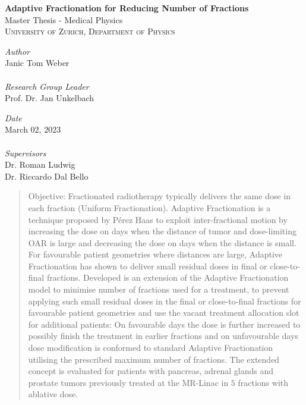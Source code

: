 \documentclass[\relativeRoot/ada.tex]{subfiles}
\begin{document}
\begin{titlepage}

\HRulebeta

\vspace{3cm}
  {\bfseries
	\Large\textbf{Adaptive Fractionation for Reducing Number of Fractions}
	}\\[14pt]
	{Master Thesis - Medical Physics}\\[1pt]
	\textsc{University of Zurich, Department of Physics}
	\\[5pt]
	
\begin{addmargin}[1cm]{1cm}


\begin{minipage}[t]{0.6\textwidth}
\emph{Author}\\
Janic Tom Weber\\\\
\emph{Research Group Leader}\\
Prof. Dr. Jan Unkelbach \\
\end{minipage}
\begin{minipage}[t]{0.34\textwidth}
\emph{Date}\\
March 02, 2023\\\\
\emph{Supervisors}\\
Dr. Roman Ludwig \\
Dr. Riccardo Dal Bello\\[10pt]
\end{minipage}

\end{addmargin}

	

	
\begin{abstract}

    Objective: Fractionated radiotherapy typically delivers the same dose in each fraction (Uniform Fractionation). Adaptive Fractionation is a technique proposed by Pérez Haas \cite{perezhaas_adaptive} to exploit inter-fractional motion by increasing the dose on days when the distance of tumor and dose-limiting OAR is large and decreasing the dose on days when the distance is small. For favourable patient geometries where distances are large, Adaptive Fractionation has shown to deliver small residual doses in final or close-to-final fractions. Developed is an extension of the Adaptive Fractionation model to minimise number of fractions used for a treatment, to prevent applying such small residual doses in the final or close-to-final fractions for favourable patient geometries and use the vacant treatment allocation slot for additional patients: On favourable days the dose is further increased to possibly finish the treatment in earlier fractions and on unfavourable days dose modification is conformed to standard Adaptive Fractionation utilising the prescribed maximum number of fractions. The extended concept is evaluated for patients with pancreas, adrenal glands and prostate tumors previously treated at the MR-Linac in $5$ fractions with ablative dose.


\end{abstract}
\end{titlepage}
\end{document}
